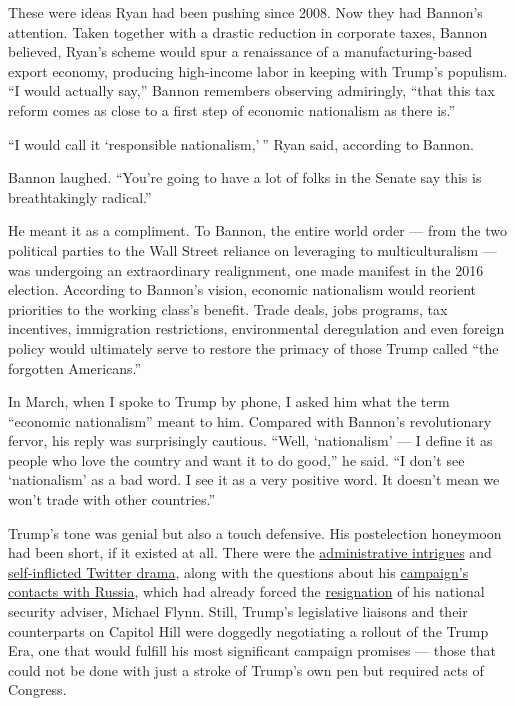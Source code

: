 These were ideas Ryan had been pushing since 2008. Now they had Bannon's
attention. Taken together with a drastic reduction in corporate taxes,
Bannon believed, Ryan's scheme would spur a renaissance of a
manufacturing-based export economy, producing high-income labor in
keeping with Trump's populism. ``I would actually say,'' Bannon
remembers observing admiringly, ``that this tax reform comes as close to
a first step of economic nationalism as there is.''

``I would call it `responsible nationalism,' '' Ryan said, according to
Bannon.

Bannon laughed. ``You're going to have a lot of folks in the Senate say
this is breathtakingly radical.''

He meant it as a compliment. To Bannon, the entire world order --- from
the two political parties to the Wall Street reliance on leveraging to
multiculturalism --- was undergoing an extraordinary realignment, one
made manifest in the 2016 election. According to Bannon's vision,
economic nationalism would reorient priorities to the working class's
benefit. Trade deals, jobs programs, tax incentives, immigration
restrictions, environmental deregulation and even foreign policy would
ultimately serve to restore the primacy of those Trump called ``the
forgotten Americans.''

In March, when I spoke to Trump by phone, I asked him what the term
``economic nationalism'' meant to him. Compared with Bannon's
revolutionary fervor, his reply was surprisingly cautious. ``Well,
`nationalism' --- I define it as people who love the country and want it
to do good,'' he said. ``I don't see `nationalism' as a bad word. I see
it as a very positive word. It doesn't mean we won't trade with other
countries.''

Trump's tone was genial but also a touch defensive. His postelection
honeymoon had been short, if it existed at all. There were the
\href{https://www.nytimes3xbfgragh.onion/2017/02/05/us/politics/trump-white-house-aides-strategy.html}{administrative
intrigues} and
\href{http://fortune.com/2017/01/11/real-donald-trump-twitter-delete-account/}{self-inflicted
Twitter drama}, along with the questions about his
\href{https://www.nytimes3xbfgragh.onion/2017/02/14/us/politics/russia-intelligence-communications-trump.html}{campaign's
contacts with Russia}, which had already forced the
\href{https://www.nytimes3xbfgragh.onion/2017/02/13/us/politics/donald-trump-national-security-adviser-michael-flynn.html}{resignation}
of his national security adviser, Michael Flynn. Still, Trump's
legislative liaisons and their counterparts on Capitol Hill were
doggedly negotiating a rollout of the Trump Era, one that would fulfill
his most significant campaign promises --- those that could not be done
with just a stroke of Trump's own pen but required acts of Congress.


